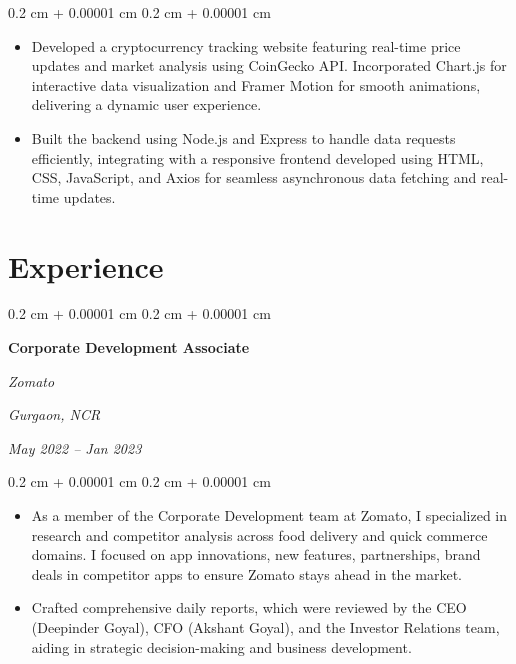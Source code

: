 \documentclass[10pt, letterpaper]{article}
\newenvironment{highlights}{
    \begin{itemize}[
        topsep=0.10 cm,
        parsep=0.10 cm,
        partopsep=0pt,
        itemsep=0pt,
        leftmargin=0.4 cm + 10pt
    ]
}{
    \end{itemize}
} %
\newenvironment{onecolentry}{
    \begin{adjustwidth}{
        0.2 cm + 0.00001 cm
    }{
        0.2 cm + 0.00001 cm
    }
}{
    \end{adjustwidth}
} %
\newenvironment{twocolentry}[2][]{
    \onecolentry
    \def\secondColumn{#2}
    \setcolumnwidth{\fill, 4.5 cm}
    \begin{paracol}{2}
}{
    \switchcolumn \raggedleft \secondColumn
    \end{paracol}
    \endonecolentry
} %
\begin{document}
        \vspace{0.10 cm}
        \begin{onecolentry}
            \begin{highlights}
                \item Developed a cryptocurrency tracking website featuring real-time price updates and market analysis using CoinGecko API. Incorporated Chart.js for interactive data visualization and Framer Motion for smooth animations, delivering a dynamic user experience.
                \item Built the backend using Node.js and Express to handle data requests efficiently, integrating with a responsive frontend developed using HTML, CSS, JavaScript, and Axios for seamless asynchronous data fetching and real-time updates.
            \end{highlights}
        \end{onecolentry}

   \section{Experience}

        
        \begin{twocolentry}{
        \textit{Gurgaon, NCR}    
            
        \textit{May 2022 – Jan 2023}}
            \textbf{Corporate Development Associate}
            
            \textit{Zomato}
        \end{twocolentry}

        \vspace{0.10 cm}
        \begin{onecolentry}
            \begin{highlights}
                \item As a member of the Corporate Development team at Zomato, I specialized in research and competitor analysis across food delivery and quick commerce domains. I focused on app innovations, new features, partnerships, brand deals in competitor apps to ensure Zomato stays ahead in the market.
                \item Crafted comprehensive daily reports, which were reviewed by the CEO (Deepinder Goyal), CFO (Akshant Goyal), and the Investor Relations team, aiding in strategic decision-making and business development.
            \end{highlights}
        \end{onecolentry}
\end{document}
